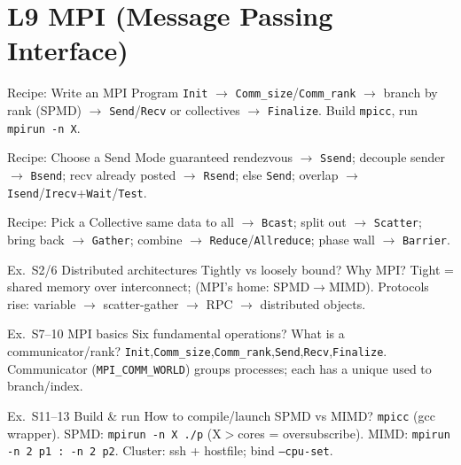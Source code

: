 \section{L9 MPI (Message Passing Interface)}

\begin{KR}{Recipe: Write an MPI Program}
    \texttt{Init} $\to$ \texttt{Comm\_size}/\texttt{Comm\_rank} $\to$ branch by rank (SPMD) $\to$ \texttt{Send}/\texttt{Recv} or collectives $\to$ \texttt{Finalize}. Build \texttt{mpicc}, run \texttt{mpirun -n X}.
\end{KR}

\begin{KR}{Recipe: Choose a Send Mode}
    guaranteed rendezvous $\to$ \texttt{Ssend}; decouple sender $\to$ \texttt{Bsend}; recv already posted $\to$ \texttt{Rsend}; else \texttt{Send}; overlap $\to$ \texttt{Isend}/\texttt{Irecv}+\texttt{Wait}/\texttt{Test}.
\end{KR}

\begin{KR}{Recipe: Pick a Collective}
    same data to all $\to$ \texttt{Bcast}; split out $\to$ \texttt{Scatter}; bring back $\to$ \texttt{Gather}; combine $\to$ \texttt{Reduce}/\texttt{Allreduce}; phase wall $\to$ \texttt{Barrier}.
\end{KR}

\begin{example2}{Ex.\ S2/6 Distributed architectures}
    Tightly vs loosely bound? Why MPI?
    \tcblower
    Tight = shared memory over interconnect;  (MPI's home: SPMD$\to$MIMD). Protocols rise: variable $\to$ scatter-gather $\to$ RPC $\to$ distributed objects.
\end{example2}

\begin{example2}{Ex.\ S7--10 MPI basics}
    Six fundamental operations? What is a communicator/rank?
    \tcblower
    \texttt{Init},\texttt{Comm\_size},\texttt{Comm\_rank},\texttt{Send},\texttt{Recv},\texttt{Finalize}. Communicator (\texttt{MPI\_COMM\_WORLD}) groups processes; each has a unique  used to branch/index.
\end{example2}

\begin{example2}{Ex.\ S11--13 Build \& run}
    How to compile/launch SPMD vs MIMD?
    \tcblower
    \texttt{mpicc} (gcc wrapper). SPMD: \texttt{mpirun -n X ./p} (X$>$cores = oversubscribe). MIMD: \texttt{mpirun -n 2 p1 : -n 2 p2}. Cluster: ssh + hostfile; bind \texttt{--cpu-set}.
\end{example2}

